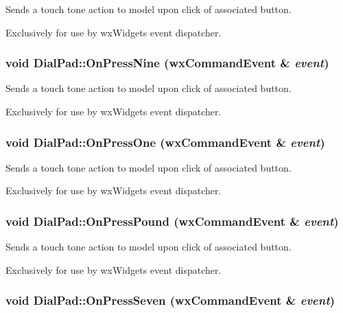 Sends a touch tone action to model upon click of associated button. 

Exclusively for use by wxWidgets event dispatcher. \hypertarget{classDialPad_fd908470bb6b43597ba2169bfd6e0271}{
\subsubsection[{OnPressNine}]{\setlength{\rightskip}{0pt plus 5cm}void DialPad::OnPressNine (wxCommandEvent \& {\em event})}}
\label{classDialPad_fd908470bb6b43597ba2169bfd6e0271}


Sends a touch tone action to model upon click of associated button. 

Exclusively for use by wxWidgets event dispatcher. \hypertarget{classDialPad_5b55819a3a90ff5abf9e1c6f7c36126c}{
\subsubsection[{OnPressOne}]{\setlength{\rightskip}{0pt plus 5cm}void DialPad::OnPressOne (wxCommandEvent \& {\em event})}}
\label{classDialPad_5b55819a3a90ff5abf9e1c6f7c36126c}


Sends a touch tone action to model upon click of associated button. 

Exclusively for use by wxWidgets event dispatcher. \hypertarget{classDialPad_19c18972706083103c18228c64a0acbb}{
\subsubsection[{OnPressPound}]{\setlength{\rightskip}{0pt plus 5cm}void DialPad::OnPressPound (wxCommandEvent \& {\em event})}}
\label{classDialPad_19c18972706083103c18228c64a0acbb}


Sends a touch tone action to model upon click of associated button. 

Exclusively for use by wxWidgets event dispatcher. \hypertarget{classDialPad_fdfbc9b26eabdd85d512a21aaf9bf883}{
\subsubsection[{OnPressSeven}]{\setlength{\rightskip}{0pt plus 5cm}void DialPad::OnPressSeven (wxCommandEvent \& {\em event})}}
\label{classDialPad_fdfbc9b26eabdd85d512a21aaf9bf883}


